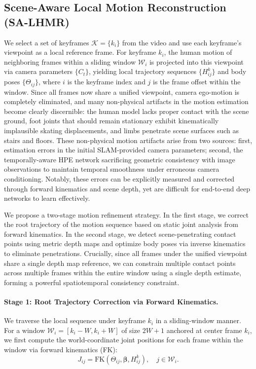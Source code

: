 \subsection{Scene-Aware Local Motion Reconstruction (SA-LHMR)}
\label{sec:sa-lhmr}
We select a set of keyframes $\mathcal{K} = \{k_i\}$ from the video and use each keyframe's viewpoint as a local reference frame. For keyframe $k_i$, the human motion of neighboring frames within a sliding window $\mathcal{W}_i$ is projected into this viewpoint via camera parameters $\{C_t\}$, yielding local trajectory sequences $\{H_{ij}^{k}\}$ and body poses $\{\Theta_{ij}\}$, where $i$ is the keyframe index and $j$ is the frame offset within the window. Since all frames now share a unified viewpoint, camera ego-motion is completely eliminated, and many non-physical artifacts in the motion estimation become clearly discernible: the human model lacks proper contact with the scene ground, foot joints that should remain stationary exhibit kinematically implausible skating displacements, and limbs penetrate scene surfaces such as stairs and floors. These non-physical motion artifacts arise from two sources: first, estimation errors in the initial SLAM-provided camera parameters; second, the temporally-aware HPE network sacrificing geometric consistency with image observations to maintain temporal smoothness under erroneous camera conditioning. Notably, these errors can be explicitly measured and corrected through forward kinematics and scene depth, yet are difficult for end-to-end deep networks to learn effectively.

We propose a two-stage motion refinement strategy. In the first stage, we correct the root trajectory of the motion sequence based on static joint analysis from forward kinematics. In the second stage, we detect scene-penetrating contact points using metric depth maps and optimize body poses via inverse kinematics to eliminate penetrations. Crucially, since all frames under the unified viewpoint share a single depth map reference, we can constrain multiple contact points across multiple frames within the entire window using a single depth estimate, forming a powerful spatiotemporal consistency constraint.

\paragraph{Stage 1: Root Trajectory Correction via Forward Kinematics.}
We traverse the local sequence under keyframe $k_i$ in a sliding-window manner. For a window $\mathcal{W}_i = [k_i{-}W, k_i{+}W]$ of size $2W{+}1$ anchored at center frame $k_i$, we first compute the world-coordinate joint positions for each frame within the window via forward kinematics (FK):
%
\begin{equation}
  J_{ij} = \text{FK}(\Theta_{ij}, \boldsymbol{\beta}, H_{ij}^{k}), \quad j \in \mathcal{W}_i.
\end{equation}

